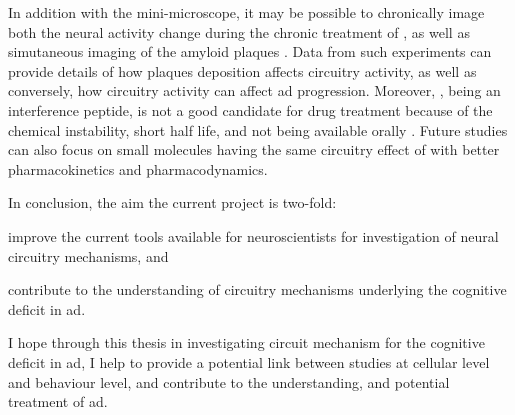 In addition with the mini-microscope, it may be possible to chronically image both the neural activity change during the chronic treatment of \tglu, as well as simutaneous imaging of the amyloid plaques \citep{zhang15}. Data from such experiments can provide details of how plaques deposition affects circuitry activity, as well as conversely, how circuitry activity can affect \gls{ad} progression. Moreover, \tglu, being an interference peptide, is not a good candidate for drug treatment because of the chemical instability, short half life, and not being available orally \citep{fosgerau15}. Future studies can also focus on small molecules having the same circuitry effect of \tglu with better pharmacokinetics and pharmacodynamics. 

In conclusion, the aim the current project is two-fold: 
\begin{enumerate*}[label={\alph*)}, font={\bfseries}]
    \item improve the current tools available for neuroscientists for investigation of neural circuitry mechanisms, and
    \item contribute to the understanding of circuitry mechanisms underlying the cognitive deficit in \gls{ad}.
\end{enumerate*}
I hope through this thesis in investigating circuit mechanism for the cognitive deficit in \gls{ad}, I help to provide a potential link between studies at cellular level and behaviour level, and contribute to the understanding, and potential treatment of \gls{ad}.







